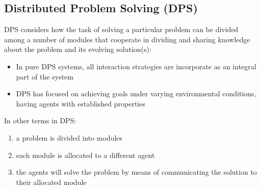 \subsection{Distributed Problem Solving (DPS)}
DPS considers how the task of solving a particular problem can be divided among a number of modules that cooperate in dividing and sharing knowledge about the problem and its evolving solution(s):
\begin{itemize}
\item In pure DPS systems, all interaction strategies are incorporate as an integral part of the system
\item DPS has focused on achieving goals under varying environmental conditions, having agents with established properties
\end{itemize}

In other terms in DPS:
\begin{enumerate}
\item a problem is divided into modules 
\item each module is allocated to a different agent
\item the agents will solve the problem by means of communicating the solution to their allocated module
\end{enumerate}


